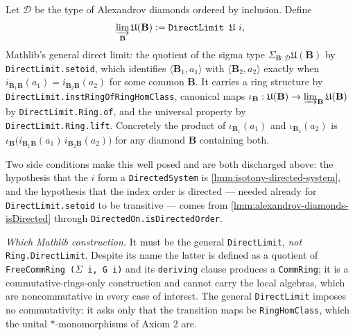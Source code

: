 \begin{definition}
    \label{def:quasilocal-colimit}
    Let $\mathcal{D}$ be the type of Alexandrov diamonds ordered by inclusion. Define
    \begin{align}
        \varinjlim_{\mathbf{B}} \mathfrak{U}(\mathbf{B}) := \texttt{DirectLimit } \mathfrak{U}\ i,
    \end{align}
    Mathlib's general direct limit: the quotient of the sigma type $\Sigma_{\mathbf{B} : \mathcal{D}} \mathfrak{U}(\mathbf{B})$ by \texttt{DirectLimit.setoid}, which identifies $\langle \mathbf{B}_1, a_1\rangle$ with $\langle \mathbf{B}_2, a_2\rangle$ exactly when $i_{\mathbf{B}_1\mathbf{B}}(a_1) = i_{\mathbf{B}_2\mathbf{B}}(a_2)$ for some common $\mathbf{B}$. It carries a ring structure by \texttt{DirectLimit.instRingOfRingHomClass}, canonical maps $\iota_{\mathbf{B}} : \mathfrak{U}(\mathbf{B}) \to \varinjlim_{\mathbf{B}} \mathfrak{U}(\mathbf{B})$ by \texttt{DirectLimit.Ring.of}, and the universal property by \texttt{DirectLimit.Ring.lift}. Concretely the product of $\iota_{\mathbf{B}_1}(a_1)$ and $\iota_{\mathbf{B}_2}(a_2)$ is $\iota_{\mathbf{B}}\bigl(i_{\mathbf{B}_1\mathbf{B}}(a_1)\, i_{\mathbf{B}_2\mathbf{B}}(a_2)\bigr)$ for any diamond $\mathbf{B}$ containing both.

    Two side conditions make this well posed and are both discharged above: the hypothesis that the $i$ form a \texttt{DirectedSystem} is \ref{lmm:isotony-directed-system}, and the hypothesis that the index order is directed --- needed already for \texttt{DirectLimit.setoid} to be transitive --- comes from \ref{lmm:alexandrov-diamonds-isDirected} through \texttt{DirectedOn.isDirectedOrder}.

    \emph{Which Mathlib construction.} It must be the general \texttt{DirectLimit}, \emph{not} \texttt{Ring.DirectLimit}. Despite its name the latter is defined as a quotient of \texttt{FreeCommRing (\ensuremath{\Sigma} i, G i)} and its \texttt{deriving} clause produces a \texttt{CommRing}; it is a commutative-rings-only construction and cannot carry the local algebras, which are noncommutative in every case of interest. The general \texttt{DirectLimit} imposes no commutativity: it asks only that the transition maps be \texttt{RingHomClass}, which the unital $*$-monomorphisms of Axiom 2 are.
\end{definition}

